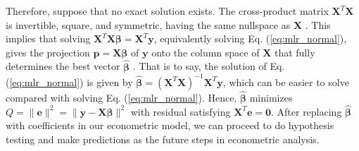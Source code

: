 \documentclass[final]{siamart1116}
\begin{document}
Therefore, suppose that no exact solution exists. The cross-product matrix $\pmb{X}^{T}\pmb{X}$ is invertible, square, and symmetric, having the same nullspace as $\pmb{X}$ \cite{bk:strang2}. This implies that solving $\pmb{X}^{T}\pmb{X}\pmb{\beta}=\pmb{X}^{T}\pmb{y}$, equivalently solving Eq. (\ref{eq:mlr_normal}), gives the projection $\pmb{p}=\pmb{X}\pmb{\beta}$ of $\pmb{y}$ onto the column space of $\pmb{X}$ that fully determines the best vector $\pmb{\widehat{\beta}}$ \cite{bk:strang}. That is to say, the solution of Eq. (\ref{eq:mlr_normal}) is given by $\pmb{\widehat{\beta}}=(\pmb{X}^{T}\pmb{X})^{-1}\pmb{X}^{T}\pmb{y}$, which can be easier to solve compared with solving Eq. (\ref{eq:mlr_normal}). Hence, $\pmb{\widehat{\beta}}$ minimizes $Q=\|\pmb{e}\|^2=\|\pmb{y}-\pmb{X}\pmb{\beta}\|^2$ with residual satisfying $\pmb{X}^{T}\pmb{e}=\pmb{0}$. After replacing $\pmb{\widehat{\beta}}$ with coefficients in our econometric model, we can proceed to do hypothesis testing and make predictions as the future steps in econometric analysis.





\end{document}
